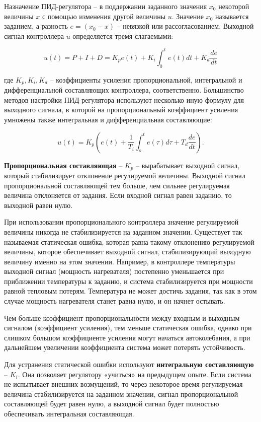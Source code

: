 Назначение ПИД-регулятора – в поддержании заданного значения $x_0$ некоторой величины $x$ с помощью изменения другой величины $u$. Значение $x_0$ называется заданием, а разность $e=(x_0-x)$ – невязкой или рассогласованием. Выходной сигнал контроллера $u$ определяется тремя слагаемыми:

\begin{equation}
    \label{eq_PID}
    u(t) = P + I + D = K_p e(t) + K_i \int_{0}^{t} e(t) dt + K_d \frac{de}{dt}
\end{equation}

где $K_p, K_i, K_d$ – коэффициенты усиления пропорциональной, интегральной и дифференциальной составляющих контроллера, соответственно.
Большинство методов настройки ПИД-регулятора используют несколько иную формулу для выходного сигнала, в которой на пропорциональный коэффициент усиления умножены также интегральная и дифференциальная составляющие:

\begin{equation}
    u(t) = K_p \left( e(t) + \frac{1}{T_i} \int_{o}^{t} e(\tau) d \tau +T_d \frac{de}{dt}\right).
\end{equation}

\textbf{Пропорциональная составляющая} – $K_p$ – вырабатывает выходной сигнал, который стабилизирует отклонение регулируемой величины. Выходной сигнал пропорциональной составляющей тем больше, чем сильнее регулируемая величина отклоняется от задания. Если входной сигнал равен заданию, то выходной равен нулю.

При использовании пропорционального контроллера значение регулируемой величины никогда не стабилизируется на заданном значении. Существует так называемая статическая ошибка, которая равна такому отклонению регулируемой величины, которое обеспечивает выходной сигнал, стабилизирующий выходную величину именно на этом значении. Например, в контроллере температуры выходной сигнал (мощность нагревателя) постепенно уменьшается при приближении температуры к заданию, и система стабилизируется при мощности равной тепловым потерям. Температура не может достичь задания, так как в этом случае мощность нагревателя станет равна нулю, и он начнет остывать.

Чем больше коэффициент пропорциональности между входным и выходным сигналом (коэффициент усиления), тем меньше статическая ошибка, однако при слишком большом коэффициенте усиления могут начаться автоколебания, а при дальнейшем увеличении коэффициента система может потерять устойчивость.

Для устранения статической ошибки используют \textbf{интегральную составляющую} – $K_i$. Она позволяет регулятору «учиться» на предыдущем опыте. Если система не испытывает внешних возмущений, то через некоторое время регулируемая величина стабилизируется на заданном значении, сигнал пропорциональной составляющей будет равен нулю, а выходной сигнал будет полностью обеспечивать интегральная составляющая.

